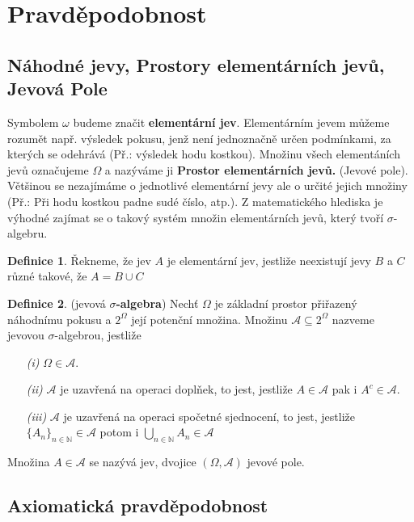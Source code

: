 \documentclass[a4]{report}
\theoremstyle{definition}
\newtheorem{definition}{Definice}[section]
\begin{document}
{\section{Pravděpodobnost}
\subsection{Náhodné jevy, Prostory elementárních jevů, Jevová Pole}
Symbolem $\omega$ budeme značit \textbf{elementární jev}. Elementárním jevem můžeme rozumět např. výsledek pokusu, jenž není jednoznačně určen podmínkami, za kterých se odehrává (Př.: výsledek hodu kostkou). Množinu všech elementáních jevů označujeme $\Omega$ a nazýváme ji \textbf{Prostor elementárních jevů.} (Jevové pole). Většinou se nezajímáme o jednotlivé elementární jevy ale o určité jejich množiny (Př.: Při hodu kostkou padne sudé číslo, atp.). Z matematického hlediska  je výhodné zajímat se o takový systém množin elementárních jevů, který tvoří $\sigma$-algebru.

\begin{definition}
Řekneme, že jev $A$ je elementární jev, jestliže neexistují jevy $B$ a $C$ různé takové, že $A=B\cup C$
\end{definition}

\begin{definition}\label{SihmaAlgebra}(jevová \textbf{$\sigma$-algebra})
Nechť $ \Omega $ je základní prostor přiřazený náhodnímu pokusu a $ 2^{\Omega} $ její potenční množina. Množinu $\mathcal{A} \subseteq 2^{\Omega} $ nazveme jevovou $\sigma$-algebrou, jestliže
\begin{itemize}
\item[\textit{(i)}] $ \Omega \in \mathcal{A} $.
\item[\textit{(ii)}] $\mathcal{A}$ je uzavřená na operaci doplňek, to jest, jestliže $A \in \mathcal{A}$ pak i $ A^{c} \in \mathcal{A} $.
\item[\textit{(iii)}] $\mathcal{A}$ je uzavřená na operaci spočetné sjednocení, to jest, jestliže $ \lbrace A_{n} \rbrace_{n \in \mathbb{N}} \in \mathcal{A}$ potom i $ \bigcup_{n \in \mathbb{N}}A_{n} \in \mathcal{A} $
\end{itemize}
Množina $A\in \mathcal{A} $ se nazývá jev, dvojice $(\Omega,\mathcal{A})$ jevové pole.
\end{definition}

\subsection{Axiomatická pravděpodobnost}

}
\end{document}
